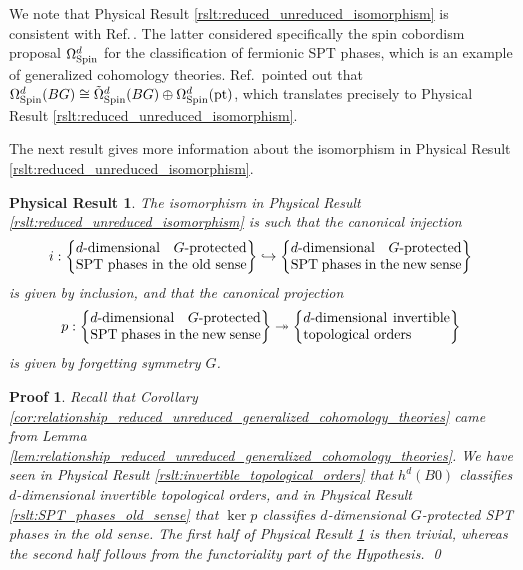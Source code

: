 \documentclass[sort&compress]{elsarticle}
\theoremstyle{theoremstyle}
\theoremstyle{framedtheoremstyle}
\newtheorem{rslt}{Physical Result}
\theoremstyle{definitionstyle}
\theoremstyle{definitionstyle}
\theoremstyle{definitionstyle}
\theoremstyle{definitionstyle}
\theoremstyle{nameddefinitionstyle}
\theoremstyle{framednameddefinitionstyle}
\theoremstyle{proofstyle}
\newtheorem{pf}{Proof}
\theoremstyle{definitionstyle}
\newcommand{\oneone}{\hookrightarrow}
\newcommand{\onto}{\twoheadrightarrow}
\DeclareMathOperator{\kernel}{ker}
\newcommand{\isomorphic}{\cong}
\newcommand{\paren}[1]{\left( #1 \right)}
\newcommand{\braces}[1]{\left\{ #1 \right\}}
\DeclareMathOperator{\pt}{pt}
\begin{document}
We note that Physical Result \ref{rslt:reduced_unreduced_isomorphism} is consistent with Ref.\,\cite{Kapustin_Fermion}. The latter considered specifically the spin cobordism proposal $\Omega^d_{\rm Spin}$ for the classification of fermionic SPT phases, which is an example of generalized cohomology theories. Ref.\,\cite{Kapustin_Fermion} pointed out that $\Omega^d_{\rm Spin}(BG) \isomorphic \tilde \Omega^d_{\rm Spin}(BG) \oplus \Omega^d_{\rm Spin}(\pt)$, which translates precisely to Physical Result \ref{rslt:reduced_unreduced_isomorphism}.

The next result gives more information about the isomorphism in Physical Result \ref{rslt:reduced_unreduced_isomorphism}.

\begin{framed}\begin{rslt}
The isomorphism in Physical Result \ref{rslt:reduced_unreduced_isomorphism} is such that the canonical injection
\begin{eqnarray}
i: \braces{\parbox{4.3cm}{$d$-dimensional $G$-protected SPT phases in the old sense}} 
\oneone
\braces{\parbox{4.3cm}{$d$-dimensional $G$-protected SPT phases in the new sense}}
\end{eqnarray}
is given by inclusion, and that the canonical projection
\begin{eqnarray}
p:
\braces{\parbox{4.3cm}{$d$-dimensional $G$-protected SPT phases in the new sense}} 
\onto
\braces{\parbox{3.7cm}{$d$-dimensional invertible topological orders}}
\end{eqnarray}
is given by forgetting symmetry $G$.\label{rslt:reduced_unreduced_maps}
\end{rslt}\end{framed}

\begin{pf}
Recall that Corollary \ref{cor:relationship_reduced_unreduced_generalized_cohomology_theories} came from Lemma \ref{lem:relationship_reduced_unreduced_generalized_cohomology_theories}.
We have seen in Physical Result \ref{rslt:invertible_topological_orders} that $h^d\paren{B0}$ classifies $d$-dimensional invertible topological orders, and in Physical Result \ref{rslt:SPT_phases_old_sense} that $\kernel p$ classifies $d$-dimensional $G$-protected SPT phases in the old sense.
The first half of Physical Result \ref{rslt:reduced_unreduced_maps} is then trivial, whereas the second half follows from the functoriality part of the Hypothesis.
\qed\end{pf}
\end{document}
